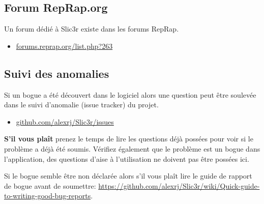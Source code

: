 
\subsection{Forum RepRap.org} %
\label{sub:reprap_org_forum}


Un forum d\'edi\'e \`a Slic3r existe dans les forums RepRap.
\begin{itemize}
    \item \url{forums.reprap.org/list.php?263}
\end{itemize}


\subsection{Suivi des anomalies} %
\label{sub:issue_tracker}

Si un bogue a \'et\'e d\'ecouvert dans le logiciel alors une question peut \^etre soulev\'ee dans le suivi d'anomalie (issue tracker) du projet.

\begin{itemize}
    \item \url{github.com/alexrj/Slic3r/issues}
\end{itemize}

\textbf{S'il vous pla\^it} prenez le temps de lire les questions d\'ej\`a poss\'ees pour voir si le probl\`eme a d\'ej\`a \'et\'e soumis. V\'erifiez \'egalement que le probl\`eme est un bogue dans l'application, des questions d'aise \`a l'utilisation ne doivent pas \^etre poss\'ees ici.

Si le bogue semble \^etre non d\'eclar\'ee alors s'il vous pla\^it lire le guide de rapport de bogue avant de soumettre: \url{https://github.com/alexrj/Slic3r/wiki/Quick-guide-to-writing-good-bug-reports}.


